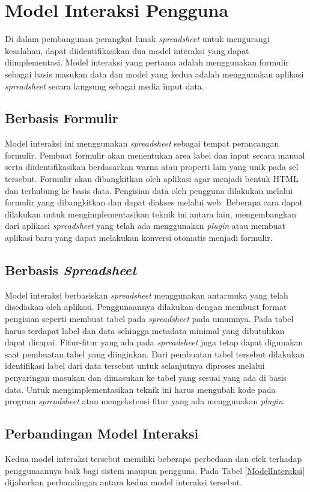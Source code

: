\section{Model Interaksi Pengguna}
Di dalam pembangunan perangkat lunak \textit{spreadsheet} untuk mengurangi kesalahan, dapat diidentifikasikan dua model interaksi yang dapat diimplementasi. Model interaksi yang pertama adalah menggunakan formulir sebagai basis masukan data dan model yang kedua adalah menggunakan aplikasi \textit{spreadsheet} secara langsung sebagai media input data.
	\subsection{Berbasis Formulir}
	Model interaksi ini menggunakan \textit{spreadsheet} sebagai tempat perancangan formulir. Pembuat formulir akan menentukan area label dan input secara manual serta diidentifikasikan berdasarkan warna atau properti lain yang unik pada sel tersebut. Formulir akan dibangkitkan oleh aplikasi agar menjadi bentuk HTML dan terhubung ke basis data. Pengisian data oleh pengguna dilakukan melalui formulir yang dibangkitkan dan dapat diakses melalui web. Beberapa cara dapat dilakukan untuk mengimplementasikan teknik ini antara lain, mengembangkan dari aplikasi \textit{spreadsheet} yang telah ada menggunakan \textit{plugin} atau membuat aplikasi baru yang dapat melakukan konversi otomatis menjadi formulir.

	\subsection{Berbasis \textit{Spreadsheet}}
	Model interaksi berbasiskan \textit{spreadsheet} menggunakan antarmuka yang telah disediakan oleh aplikasi. Penggunaannya dilakukan dengan membuat format pengisian seperti membuat tabel pada \textit{spreadsheet} pada umumnya. Pada tabel harus terdapat label dan data sehingga metadata minimal yang dibutuhkan dapat dicapai. Fitur-fitur yang ada pada \textit{spreadsheet} juga tetap dapat digunakan saat pembuatan tabel yang diinginkan. Dari pembuatan tabel tersebut dilakukan identifikasi label dari data tersebut untuk selanjutnya diproses melalui penyaringan masukan dan dimasukan ke tabel yang sesuai yang ada di basis data. Untuk mengimplementasikan teknik ini harus mengubah kode pada program \textit{spreadsheet} atau mengekstensi fitur yang ada menggunakan \textit{plugin}. 

	\subsection{Perbandingan Model Interaksi}
	Kedua model interaksi tersebut memiliki beberapa perbedaan dan efek terhadap penggunaannya baik bagi sistem maupun pengguna. Pada Tabel \ref{ModelInteraksi} dijabarkan perbandingan antara kedua model interaksi tersebut.


